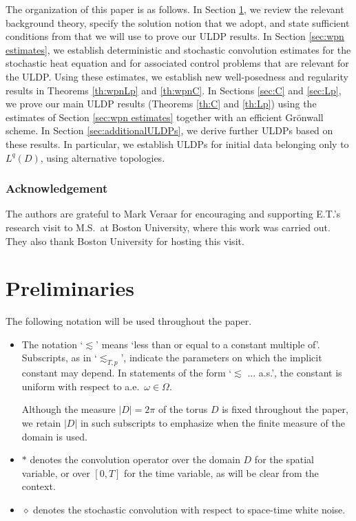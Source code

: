 \documentclass{amsart}
\theoremstyle{plain}
\theoremstyle{remark}
\theoremstyle{plain}
\numberwithin{equation}{section}
\newcommand{\Om}{\Omega}
\newcommand{\om}{\omega}
\begin{document}
The organization of this paper is as follows. 
In Section \ref{sec:prelims}, we review the relevant background theory, specify the solution notion that we adopt, and state  sufficient conditions from \cite{Salins19equivalences} that we will use to prove our ULDP results. 
In Section \ref{sec:wpn estimates}, we establish deterministic and stochastic convolution estimates for the stochastic heat equation and for associated control problems that are relevant for the ULDP. Using these estimates, we establish new well-posedness and regularity results in Theorems \ref{th:wpnLp} and \ref{th:wpnC}.   
In Sections \ref{sec:C} and \ref{sec:Lp}, we prove our main ULDP results (Theorems \ref{th:C} and \ref{th:Lp}) using the estimates of Section \ref{sec:wpn estimates} together with an efficient Gr\"onwall scheme. In Section \ref{sec:additionalULDPs}, we derive further ULDPs based on these results. In particular, we establish ULDPs for initial data belonging only to $L^q(D)$, using alternative topologies. 


\subsubsection*{Acknowledgement}
The authors are grateful to Mark Veraar for encouraging and supporting E.T.'s research visit to M.S.\ at Boston University, where this work was carried out. They also thank Boston University for hosting this visit.  

\section{Preliminaries}\label{sec:prelims}

The following notation will be used throughout the paper.
\begin{itemize}
\item The notation `$\lesssim$' means `less than or equal to a constant multiple of'. Subscripts, as in `$\lesssim_{T,p}$', indicate the parameters on which the implicit constant may depend. 
In statements of the form `$\lesssim$ ... a.s.', the constant is uniform with respect to a.e.\ $\om\in\Om$.

Although the measure $|D|=2\pi$ of the torus $D$ is fixed throughout the paper, we retain $|D|$ in such subscripts to emphasize when the finite measure of the domain is used.  
\item $*$ denotes the convolution operator over the domain $D$ for the spatial variable, or over $[0,T]$ for the time variable, as will be clear from the context.  
\item $\diamond$ denotes the stochastic convolution with respect to space-time white noise. 
\end{itemize}  
\end{document}
